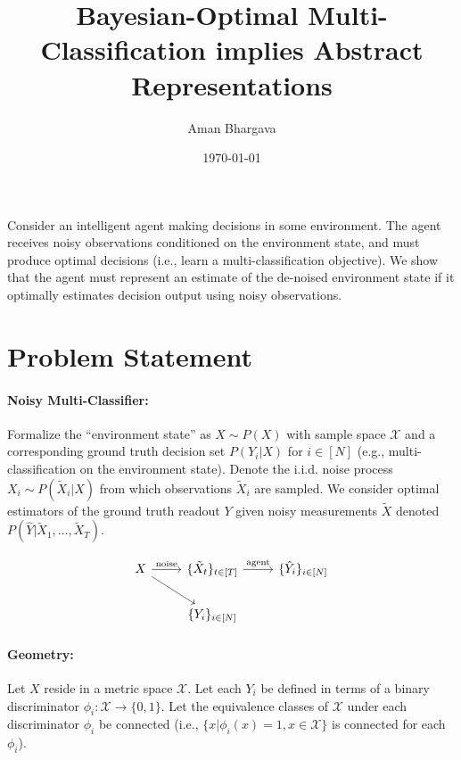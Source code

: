 \documentclass[12pt]{article}
\begin{document}
\title{Bayesian-Optimal Multi-Classification implies Abstract Representations}

\author{Aman Bhargava}

\date{\today}
\maketitle

Consider an intelligent agent making decisions in some environment.
The agent receives noisy observations conditioned on the environment state, and
must produce optimal decisions (i.e., learn a multi-classification objective).
We show that the agent must represent an estimate of the de-noised environment
state if it optimally estimates decision output using noisy observations.

\section{Problem Statement}
\label{sec:intro}


\paragraph{Noisy Multi-Classifier: } Formalize the ``environment state'' as $X
\sim P(X)$ with sample space $\mathcal X$ and a corresponding ground truth 
decision set $P(Y_i | X)$ for $i\in [N]$ (e.g., multi-classification on
the environment state). 
Denote the i.i.d. noise process $X_i \sim P(\tilde X_i | X)$ from which
observations $\tilde X_i$ are sampled. 
We consider optimal estimators of the ground truth readout $Y$ given noisy
measurements $\tilde X$ denoted $P(\hat Y | \tilde X_1, \dots, \tilde X_T)$. 


\begin{equation}
	\label{eqn:prob_statement}
	\begin{tikzcd}
		X \arrow[rd] \arrow[r, "\text{noise}"] & \{\tilde X_t\}_{t\in [T]} \arrow[r, "\text{agent}"] & \{\hat Y_i\}_{i\in [N]}\\
		& \{Y_i\}_{i\in [N]}
	\end{tikzcd}
\end{equation}


\paragraph{Geometry: } Let $X$ reside in a metric space $\mathcal X$. 
Let each $Y_i$ be defined in terms of a binary discriminator $\phi_i: \mathcal X \to \{0, 1\}$. 
Let the equivalence classes of $\mathcal X$ under each discriminator $\phi_i$ be connected (i.e., $\{x | \phi_i(x) = 1, x\in \mathcal X\}$ is connected for each $\phi_i$).
\end{document}
